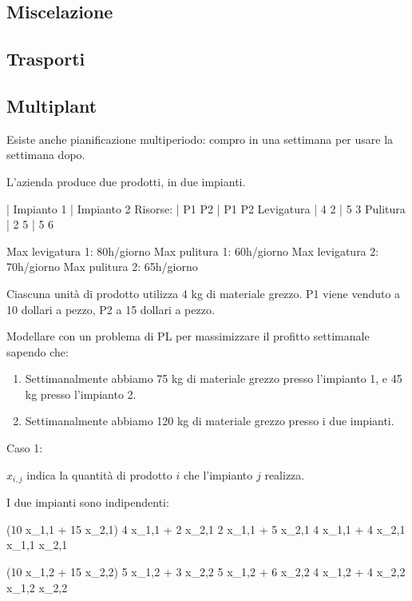 \subsection{Miscelazione}


\subsection{Trasporti}


\subsection{Multiplant}

Esiste anche pianificazione multiperiodo: compro in una settimana per usare la settimana dopo.

L'azienda produce due prodotti, in due impianti.

			| Impianto 1 | Impianto 2
Risorse:	|   P1   P2  |  P1   P2
Levigatura  |   4    2   |  5    3
Pulitura    |   2    5   |  5    6

Max levigatura 1: 80h/giorno
Max pulitura 1:   60h/giorno
Max levigatura 2: 70h/giorno
Max pulitura 2:   65h/giorno

Ciascuna unit\`a di prodotto utilizza 4 kg di materiale grezzo.
P1 viene venduto a 10 dollari a pezzo, P2 a 15 dollari a pezzo.

Modellare con un problema di PL per massimizzare il profitto settimanale sapendo che:
\begin{enumerate}
	\item Settimanalmente abbiamo 75 kg di materiale grezzo presso l'impianto 1, e 45 kg presso l'impianto 2.
	\item Settimanalmente abbiamo 120 kg di materiale grezzo presso i due impianti.
\end{enumerate}

Caso 1:

$x_{i,j}$ indica la quantit\`a di prodotto $i$ che l'impianto $j$ realizza.

I due impianti sono indipendenti:

\max (10 x_{1,1} + 15 x_{2,1})
4 x_{1,1} + 2 x_{2,1} 
2 x_{1,1} + 5 x_{2,1} 
4 x_{1,1} + 4 x_{2,1} 
x_{1,1} 
x_{2,1} 

\max (10 x_{1,2} + 15 x_{2,2})
5 x_{1,2} + 3 x_{2,2} 
5 x_{1,2} + 6 x_{2,2} 
4 x_{1,2} + 4 x_{2,2} 
x_{1,2} 
x_{2,2} 

